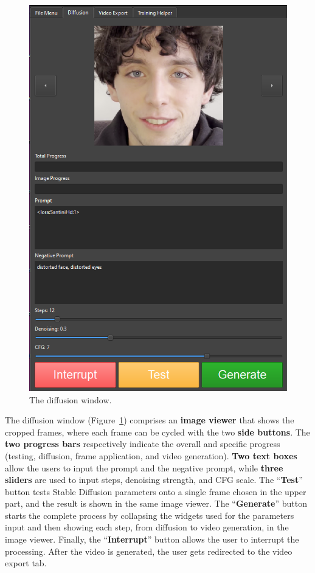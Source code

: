 \documentclass[sn-mathphys,Numbered]{sn-jnl}
\theoremstyle{thmstyleone}%
\theoremstyle{thmstyletwo}%
\theoremstyle{thmstylethree}%
\begin{document}
\begin{figure}[H]
	\centering
	\includegraphics[scale=0.45, keepaspectratio]{img/project_img/generation-window.png}
	\caption{The diffusion window.}
	\label{fig:diffusion-menu}
\end{figure}



The diffusion window (Figure~\ref{fig:diffusion-menu}) comprises an \textbf{image viewer} that 
shows the cropped frames, where each frame can be cycled with the two \textbf{side buttons}. 
The \textbf{two progress bars} respectively indicate the overall and  specific progress (testing, diffusion, frame application, and video generation). \textbf{Two text boxes} allow the users to input the prompt and the negative prompt, while \textbf{three sliders} are used to input steps, denoising strength, and CFG scale. The ``\textbf{Test}'' button tests Stable Diffusion parameters onto a single frame chosen  in the upper part, and the result is shown in the same image viewer. 
The ``\textbf{Generate}'' button starts the complete process by collapsing the widgets used  for the parameters input and then showing each step, from diffusion to video generation, 
in the image viewer. 
Finally, the ``\textbf{Interrupt}'' button allows the user to interrupt the processing.  After the video is generated, the user gets redirected to the video export tab.
\end{document}

